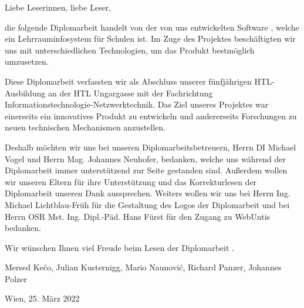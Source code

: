 
Liebe Leserinnen, liebe Leser,

die folgende Diplomarbeit handelt von der von uns entwickelten Software \ZELIA, welche ein Lehrrauminfosystem für Schulen ist. Im Zuge des Projektes beschäftigten wir uns mit unterschiedlichen Technologien, um das Produkt bestmöglich umzusetzen.

Diese Diplomarbeit verfassten wir als Abschluss unserer fünfjährigen HTL-Aus\-bildung an der HTL Ungargasse mit der Fachrichtung Informations\-technologie-Netzwerk\-technik. 
Das Ziel unseres Projektes war einerseits ein innovatives Produkt zu entwickeln und andererseits Forschungen zu neuen technischen Mechanismen anzustellen.

Deshalb möchten wir uns bei unseren Diplomarbeitsbetreuern, Herrn DI Michael Vogel und Herrn Mag. Johannes Neuhofer, bedanken, welche uns während der Diplomarbeit immer unterstützend zur Seite gestanden sind. 
Außerdem wollen wir unseren Eltern für ihre Unterstützung und das Korrekturlesen der Diplomarbeit unseren Dank aussprechen. 
Weiters wollen wir uns bei Herrn Ing. Michael Lichtblau-Früh für die Gestaltung des Logos der Diplomarbeit und bei Herrn OSR Mst. Ing. Dipl.-Päd. Hans Fürst für den Zugang zu WebUntis bedanken.

Wir wünschen Ihnen viel Freude beim Lesen der Diplomarbeit \ZELIA.

Mersed Kečo, Julian Kusternigg, Mario Naunović, Richard Panzer, Johannes Polzer

Wien, 25. März 2022
